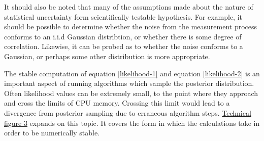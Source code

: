 It should also be noted that many of the assumptions made about the nature of statistical uncertainty form scientifically testable hypothesis. For example, it should be possible to determine whether the noise from the measurement process conforms to an i.i.d Gaussian distribtion, or whether there is some degree of correlation. Likewise, it can be probed as to whether the noise conforms to a Gaussian, or perhaps some other distribution is more appropriate.\par

The stable computation of equation \ref{likelihood-1} and equation \ref{likelihood-2} is an important aspect of running algorithms which sample the posterior distribution. Often likelihood values can be extremely small, to the point where they approach and cross the limits of CPU memory. Crossing this limit would lead to a divergence from posterior sampling due to erraneous algorithm steps. \hyperref[tf3]{Technical figure 3} expands on this topic. It covers the form in which the calculations take in order to be numerically stable.\\

